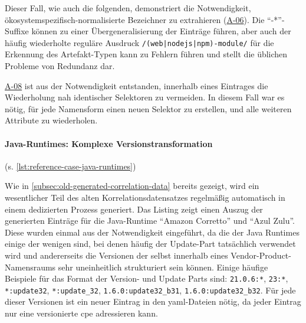 Dieser Fall, wie auch die folgenden, demonstriert die Notwendigkeit, ökosystemspezifisch-normalisierte Bezeichner zu extrahieren (\hyperref[subsec:req-type-specific-matching]{A-06}).
Die \enquote{-*}-Suffixe können zu einer Übergeneralisierung der Einträge führen, aber auch der häufig wiederholte reguläre Ausdruck \texttt{/(web|nodejs|npm)-module/} für die Erkennung des Artefakt-Typen kann zu Fehlern führen und stellt die üblichen Probleme von Redundanz dar.

\hyperref[subsec:req-multiple-attribute-values]{A-08} ist aus der Notwendigkeit entstanden, innerhalb eines Eintrages die Wiederholung nah identischer Selektoren zu vermeiden.
In diesem Fall war es nötig, für jede Namensform einen neuen Selektor zu erstellen, und alle weiteren Attribute zu wiederholen.

\paragraph{Java-Runtimes: Komplexe Versionstransformation}\label{par:reference-case-java-runtimes} (s. \autoref{lst:reference-case-java-runtimes})

Wie in \autoref{subsec:old-generated-correlation-data} bereits gezeigt, wird ein wesentlicher Teil des alten Korrelationsdatensatzes regelmäßig automatisch in einem dedizierten Prozess generiert.
Das Listing zeigt einen Auszug der generierten Einträge für die Java-Runtime \enquote{Amazon Corretto} und \enquote{Azul Zulu}.
Diese wurden einmal aus der Notwendigkeit eingeführt, da die  der Java Runtimes einige der wenigen sind, bei denen häufig der Update-Part tatsächlich verwendet wird und andererseits die Versionen der  selbst innerhalb eines Vendor-Product-Namensraums sehr uneinheitlich strukturiert sein können.
Einige häufige Beispiele für das Format der Version- und Update Parts sind: \texttt{21.0.6:*}, \texttt{23:*}, \texttt{*:update32}, \texttt{*:update\_32}, \texttt{1.6.0:update32\_b31}, \texttt{1.6.0:update32\_b32}.
Für jede dieser Versionen ist ein neuer Eintrag in den \acrshort{yaml}-Dateien nötig, da jeder Eintrag nur eine versionierte \acrshort{cpe} adressieren kann.

